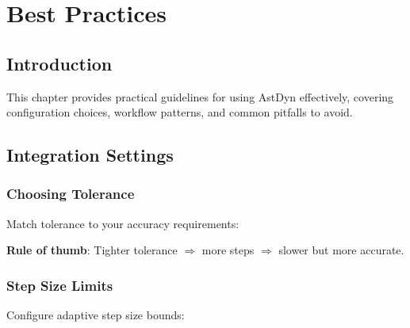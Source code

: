 \chapter{Best Practices}
\label{ch:best_practices}

\section{Introduction}

This chapter provides practical guidelines for using AstDyn effectively, covering configuration choices, workflow patterns, and common pitfalls to avoid.

\section{Integration Settings}

\subsection{Choosing Tolerance}

Match tolerance to your accuracy requirements:

\begin{table}[h]
\centering
\caption{Recommended integration tolerances}
\end{table}

\textbf{Rule of thumb}: Tighter tolerance $\Rightarrow$ more steps $\Rightarrow$ slower but more accurate.

\subsection{Step Size Limits}

Configure adaptive step size bounds:

